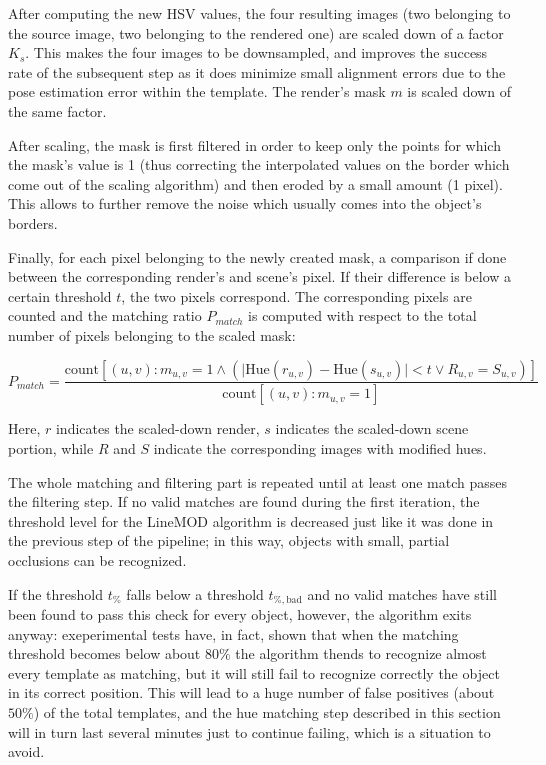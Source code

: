 After computing the new HSV values, the four resulting images (two belonging to
the source image, two belonging to the rendered one) are scaled down of a
factor $K_s$. This makes the four images to be downsampled, and improves the
success rate of the subsequent step as it does minimize small alignment errors
due to the pose estimation error within the template. The render's mask $m$ is
scaled down of the same factor.

After scaling, the mask is first filtered in order to keep only the points for
which the mask's value is 1 (thus correcting the interpolated values on the
border which come out of the scaling algorithm) and then
eroded by a small amount (1 pixel). This allows to further remove the noise
which usually comes into the object's borders.

Finally, for each pixel belonging to the newly created mask, a comparison if
done between the corresponding render's and scene's pixel. If their difference
is below a certain threshold $t$, the two pixels correspond. The corresponding
pixels are counted and the matching ratio $P_{match}$ is computed with respect to the
total number of pixels belonging to the scaled mask:

\begin{equation}
P_{match}=\frac{\text{count}\left[(u,v) : m_{u,v}=1 \wedge \left( \lvert
\text{Hue}(r_{u,v})-\text{Hue}(s_{u,v})\rvert < t \vee R_{u,v}=S_{u,v} \right)
\right]
}{\text{count}\left[ (u,v) : m_{u,v}=1 \right] }
\end{equation}

Here, $r$ indicates the scaled-down render, $s$ indicates the scaled-down scene
portion, while $R$ and $S$ indicate the corresponding images with modified hues.

The whole matching and filtering part is repeated until at least one match
passes the filtering step. If no valid matches are found during the first
iteration, the threshold level for the LineMOD algorithm is decreased
just like it was done in the previous step of the pipeline; in this
way, objects with small, partial occlusions can be recognized.

If the threshold $t_\%$ falls below a threshold $t_{\%,\text{bad}}$
and no valid matches have still been found to pass this check for every object, however, the
algorithm exits anyway: exeperimental tests have, in fact, shown that
when the matching threshold becomes below about $80\%$ the algorithm
thends to recognize almost every template as matching, but it will
still fail to recognize correctly the object in its correct
position. This will lead to a huge number of false positives (about
$50\%$) of the total templates, and the hue matching step described in
this section will in turn last several minutes just to continue
failing, which is a situation to avoid. 

